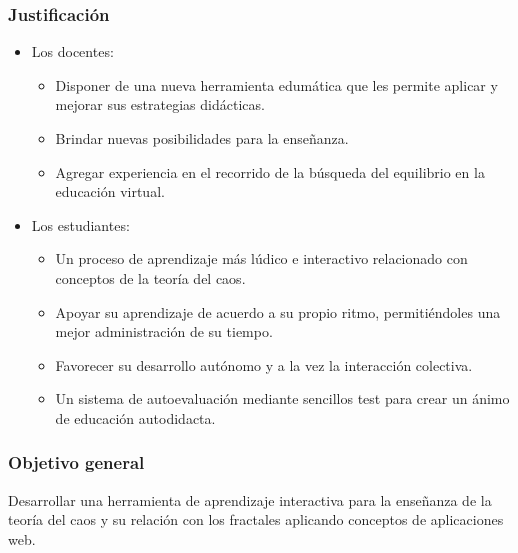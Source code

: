 \documentclass{beamer}
\begin{document}
\begin{frame}
\frametitle{Justificación}

\begin{itemize}
 \item Los docentes:
  \begin{itemize}    
    \item Disponer de una nueva herramienta edumática que les permite aplicar y mejorar sus estrategias didácticas.
    \item Brindar nuevas posibilidades para la enseñanza.
    \item Agregar experiencia en el recorrido de la búsqueda del equilibrio en la educación virtual.
  \end{itemize}
  \item Los estudiantes:  
  \begin{itemize}    
    \item Un proceso de aprendizaje más lúdico e interactivo relacionado con conceptos de la teoría del caos.
    \item Apoyar su aprendizaje de acuerdo a su propio ritmo, permitiéndoles una mejor administración de su tiempo.
    \item Favorecer su desarrollo autónomo y a la vez la interacción colectiva.  
    \item Un sistema de autoevaluación mediante sencillos test para crear un ánimo de educación autodidacta.
  \end{itemize}
\end{itemize}

\end{frame}
\begin{frame}
\frametitle{Objetivo general}
Desarrollar una herramienta de aprendizaje interactiva para la enseñanza de la teoría del caos y su relación con los fractales aplicando conceptos de aplicaciones web. 
\end{frame}
\end{document}
